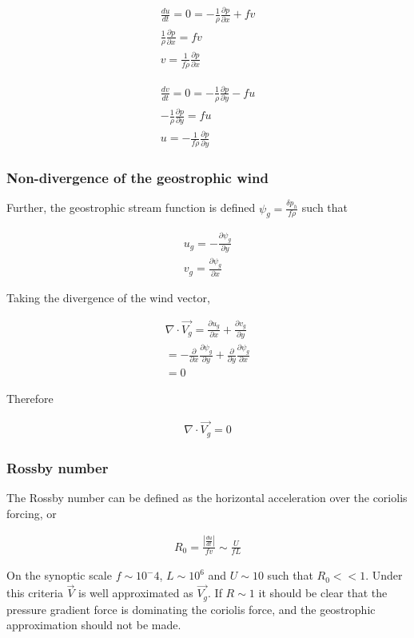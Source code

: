 \documentclass[a4paper,12pt]{article}
\begin{document}
\begin{align}
\frac{du}{dt} = 0 = -\frac{1}{\rho}\frac{\partial p}{\partial x}+ fv\\
\frac{1}{\rho}\frac{\partial p}{\partial x} = fv\\
\boxed{v = \frac{1}{f\rho}\frac{\partial p}{\partial x}}
\end{align}

\begin{align}
\frac{dv}{dt} = 0 = -\frac{1}{\rho}\frac{\partial p}{\partial y} - fu\\
-\frac{1}{\rho}\frac{\partial p}{\partial y} = fu\\
\boxed{u = -\frac{1}{f\rho}\frac{\partial p}{\partial y}}
\end{align}

\subsubsection*{Non-divergence of the geostrophic wind}
Further, the geostrophic stream function is defined $\psi_g = \frac{\delta p_{h}}{f\rho}$ such that

\begin{align}
u_g = -\frac{\partial\psi_g}{\partial y}\\
v_g = \frac{\partial\psi_g}{\partial x}
\end{align}

Taking the divergence of the wind vector,

\begin{align}
\nabla \cdot \vec{V_g} = \frac{\partial u_g}{\partial x} + \frac{\partial v_g}{\partial y}\\
= -\frac{\partial}{\partial x}\frac{\partial \psi_g}{\partial y} + \frac{\partial}{\partial y}\frac{\partial \psi_g}{\partial x}\\
= 0
\end{align}

Therefore

\begin{align}
\boxed{\nabla \cdot \vec{V_g} = 0}
\end{align}


\subsubsection*{Rossby number}

The Rossby number can be defined as the horizontal acceleration over the coriolis forcing, or

\begin{align}
\boxed{R_0 = \frac{|\frac{du}{dt}|}{fv} \sim \frac{U}{fL}}
\end{align}

On the synoptic scale $f \sim 10^-4$, $L \sim 10^6$ and $U \sim 10$ such that $R_0 << 1$. Under this criteria $\vec{V}$ is well approximated as $\vec{V_g}$. If $R \sim 1$ it should be clear that the pressure gradient force is dominating the coriolis force, and the geostrophic approximation should not be made.
\end{document}
